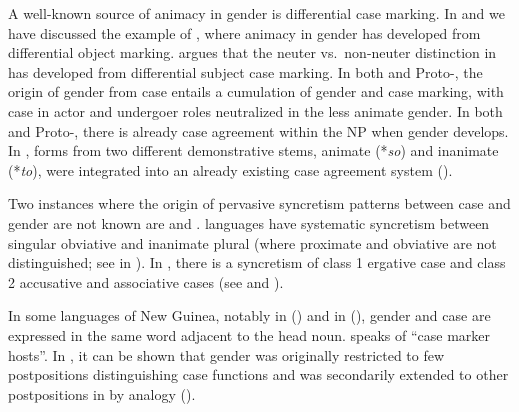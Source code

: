\documentclass[output=collectionpaper]{langsci/langscibook}
\begin{document}
A well-known source of animacy in gender is differential case marking. In  and  we have discussed the example of , where animacy in gender has developed from differential object marking. \cite[456]{Luraghi2011} argues that the neuter vs.\ non-neuter distinction in  has developed from differential subject case marking. In both  and Proto-, the origin of gender from case entails a cumulation of gender and case marking, with case in actor and undergoer roles neutralized in the less animate gender. In both  and Proto-, there is already case agreement within the NP when gender develops. In , forms from two different demonstrative stems, animate (*\textit{so}) and inanimate (*\textit{to}), were integrated into an already existing case agreement system (\citealt[456]{Luraghi2011}).

Two instances where the origin of pervasive syncretism patterns between case and gender are not known are  and .  languages have systematic syncretism between singular obviative and inanimate plural (where proximate and obviative are not distinguished; see  in ). In , there is a syncretism of class 1 ergative case and class 2 accusative and associative cases (see  and ).

In some languages of New Guinea, notably in  () and in  (), gender and case are expressed in the same word adjacent to the head noun.  speaks of ``case marker hosts''. In , it can be shown that gender was originally restricted to few postpositions distinguishing case functions and was secondarily extended to other postpositions in  by analogy (\citealt{Waelchli2018}).
\end{document}
